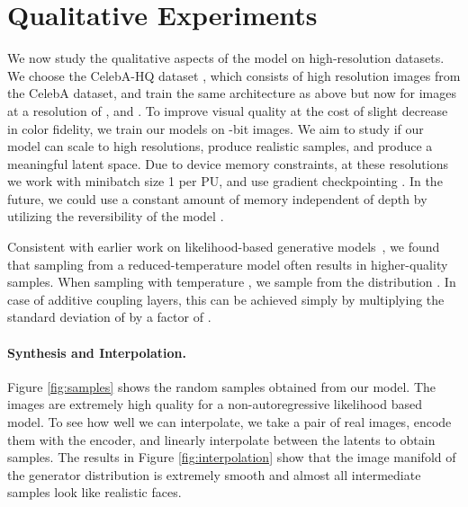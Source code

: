 \documentclass{article}
\begin{document}
\section{Qualitative Experiments}\label{sec:qualexperiments}
We now study the qualitative aspects of the model on high-resolution datasets. We choose the CelebA-HQ dataset \citep{karras2017progressive}, which consists of  high resolution images from the CelebA dataset, and train the same architecture as above but now for images at a resolution of ,  and . To improve visual quality at the cost of slight decrease in color fidelity, we train our models on -bit images. We aim to study if our model can scale to high resolutions, produce realistic samples, and produce a meaningful latent space. Due to device memory constraints, at these resolutions we work with minibatch size 1 per PU, and use gradient checkpointing \citep{gradcheckpointing}. In the future, we could use a constant amount of memory independent of depth by utilizing the reversibility of the model \citep{gomez2017reversible}.

Consistent with earlier work on likelihood-based generative models~\citep{parmar2018image}, we found that sampling from a reduced-temperature model often results in higher-quality samples. When sampling with temperature , we sample from the distribution . In case of additive coupling layers, this can be achieved simply by multiplying the standard deviation of  by a factor of .

\paragraph{Synthesis and Interpolation.}
Figure \ref{fig:samples} shows the random samples obtained from our model. The images are extremely high quality for a non-autoregressive likelihood based model. To see how well we can interpolate, we take a pair of real images, encode them with the encoder, and linearly interpolate between the latents to obtain samples. The results in Figure \ref{fig:interpolation} show that the image manifold of the generator distribution is extremely smooth and almost all intermediate samples look like realistic faces.
\end{document}

